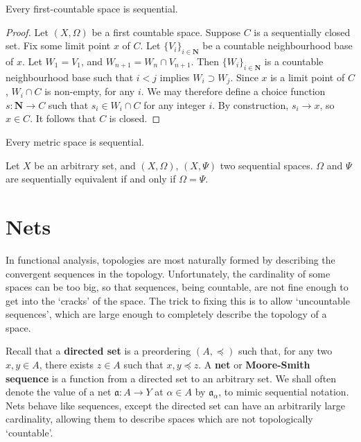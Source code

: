 \begin{lemma}
    Every first-countable space is sequential.
\end{lemma}
\begin{proof}
    Let $(X,\Omega)$ be a first countable space. Suppose $C$ is a sequentially closed set. Fix some limit point $x$ of $C$.  Let $\{ V_i \}_{i \in \mathbf{N}}$ be a countable neighbourhood base of $x$. Let $W_1 = V_1$, and $W_{n+1} = W_n \cap V_{n+1}$. Then $\{ W_i \}_{i \in \mathbf{N}}$ is a countable neighbourhood base such that $i < j$ implies $W_i \supset W_j$. Since $x$ is a limit point of $C$, $W_i \cap C$ is non-empty, for any $i$. We may therefore define a choice function $s: \mathbf{N} \to C$ such that $s_i \in W_i \cap C$ for any integer $i$. By construction, $s_i \to x$, so $x \in C$. It follows that $C$ is closed.
\end{proof}

\begin{corollary}
    Every metric space is sequential.
\end{corollary}

\begin{exercise}
    Let $X$ be an arbitrary set, and $(X, \Omega)$, $(X, \Psi)$ two sequential spaces. $\Omega$ and $\Psi$ are sequentially equivalent if and only if $\Omega = \Psi$.
\end{exercise}

\section{Nets}

In functional analysis, topologies are most naturally formed by describing the convergent sequences in the topology. Unfortunately, the cardinality of some spaces can be too big, so that sequences, being countable, are not fine enough to get into the `cracks' of the space. The trick to fixing this is to allow `uncountable sequences', which are large enough to completely describe the topology of a space.

Recall that a {\bf directed set} is a preordering $(A, \preceq)$ such that, for any two $x,y \in A$, there exists $z \in A$ such that $x,y \preceq z$. A {\bf net} or {\bf Moore-Smith sequence} is a function from a directed set to an arbitrary set. We shall often denote the value of a net $\mathfrak{a}:A \to Y$ at $\alpha \in A$ by $\mathfrak{a}_\alpha$, to mimic sequential notation. Nets behave like sequences, except the directed set can have an arbitrarily large cardinality, allowing them to describe spaces which are not topologically `countable'.

